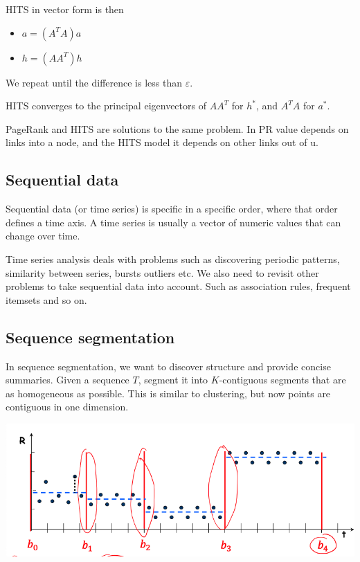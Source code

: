         HITS in vector form is then 
        \begin{itemize}
            \item $a = (A^T A)a$
            \item $h = (AA^T)h$
        \end{itemize}
        We repeat until the difference is less than $\varepsilon$. 
        
        HITS converges to the principal eigenvectors of $AA^T$ for $h^*$, and $A^TA$ for $a^*$. 
        
        PageRank and HITS are solutions to the same problem. In PR value depends on links into a node, and the HITS model it depends on other links out of u. 
        
    
    \subsection{Sequential data}
        Sequential data (or time series) is specific in a specific order, where that order defines a time axis. A time series is usually a vector of numeric values that can change over time.
        
        Time series analysis deals with problems such as discovering periodic patterns, similarity between series, bursts outliers etc. We also need to revisit other problems to take sequential data into account. Such as association rules, frequent itemsets and so on. 
        
    \subsection{Sequence segmentation}
        In sequence segmentation, we want to discover structure and provide concise summaries. Given a sequence $T$, segment it into $K$-contiguous segments that are as homogeneous as possible. This is similar to clustering, but now points are contiguous in one dimension. 
        
        \begin{center}
            \includegraphics[width=1\textwidth]{images/sequenceseg.png}
        \end{center}
        
